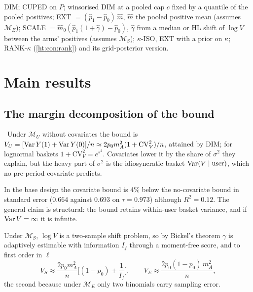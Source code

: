 \begin{definition}[Estimators]
\label{ht:def:est}
DIM; CUPED on $P$; winsorised DIM at a pooled cap $c$ fixed by a quantile of the pooled positives; EXT $= (\hat p_1 - \hat p_0)\,\hat m$, $\hat m$ the pooled positive mean (assumes $\mathcal M_E$); SCALE $= \hat m_0(\hat p_1(1 + \hat\gamma) - \hat p_0)$, $\hat\gamma$ from a median or HL shift of $\log V$ between the arms' positives (assumes $\mathcal M_S$); $\kappa$-ISO, EXT with a prior on $\kappa$; RANK-$\kappa$ (\cref{ht:con:rank}) and its grid-posterior version.
\end{definition}

\section{Main results}

\subsection{The margin decomposition of the bound}

\begin{theorem}
\label{ht:thm:floor}
\tagTransported\ Under $\mathcal M_U$ without covariates the bound is $V_U = [\operatorname{Var} Y(1) + \operatorname{Var} Y(0)]/n \approx 2p_0 m_A^2(1 + \mathrm{CV}_V^2)/n$, attained by DIM; for lognormal baskets $1 + \mathrm{CV}_V^2 = e^{s^2}$. Covariates lower it by the share of $\sigma^2$ they explain, but the heavy part of $\sigma^2$ is the idiosyncratic basket $\operatorname{Var}(V \mid \text{user})$, which no pre-period covariate predicts.
\end{theorem}

In the base design the covariate bound is 4\% below the no-covariate bound in standard error (0.664 against 0.693 on $\tau = 0.973$) although $R^2 = 0.12$. The general claim is structural: the bound retains within-user basket variance, and if $\operatorname{Var} V = \infty$ it is infinite.

Under $\mathcal M_S$, $\log V$ is a two-sample shift problem, so by Bickel's theorem $\gamma$ is adaptively estimable with information $I_f$ through a moment-free score, and to first order in $\ell$
\begin{equation}
V_S \approx \frac{2p_0 m_A^2}{n}\Big[(1 - p_0) + \frac1{I_f}\Big], \qquad
V_E \approx \frac{2p_0(1 - p_0)\,m_A^2}{n},
\label{eq:ht:VSVE}
\end{equation}
the second because under $\mathcal M_E$ only two binomials carry sampling error.

